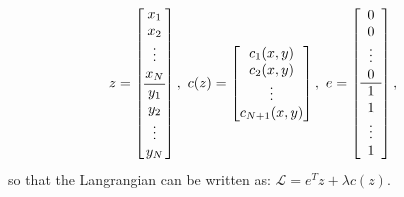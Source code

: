 \documentclass[10pt,a4paper,notitlepage,twocolumn]{article}
\begin{document}
\begin{align*}
    z &= \begin{bmatrix}
          x_{1} \\
           x_{2} \\
           \vdots \\
           \stackunder{$x_{N}$}{\rule{1.5em}{0.5pt}} \\
            y_{1} \\
           y_{2} \\
           \vdots \\
           y_{N}
    \end{bmatrix},\ 
     c(z)= \begin{bmatrix}
         c_1(x,y)\\
         c_2(x,y)\\
         \vdots\\
         c_{N+1}(x,y)
    \end{bmatrix},\ 
     e= \begin{bmatrix}
         0 \\
           0 \\
           \vdots \\
           \stackunder{$0$}{\rule{1.5em}{0.5pt}} \\
            1 \\
           1 \\
           \vdots \\
           1
         \end{bmatrix},
\end{align*}
so that the Langrangian can be written as: $\mathcal{L} = e^Tz+\lambda c(z)$.
\end{document}
